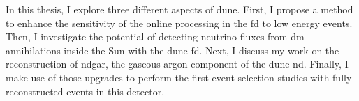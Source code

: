 In this thesis, I explore three different aspects of \gls{dune}. First, I propose a method to enhance the sensitivity of the online processing in the \gls{fd} to low energy events. Then, I investigate the potential of detecting neutrino fluxes from \gls{dm} annihilations inside the Sun with the \gls{dune} \gls{fd}. Next, I discuss my work on the reconstruction of \gls{ndgar}, the gaseous argon component of the \gls{dune} \gls{nd}. Finally, I make use of those upgrades to perform the first event selection studies with fully reconstructed events in this detector.

\begin{comment}
This thesis opens with an overview of the status of neutrino physics in Chapter \ref{chapter:neutrinos}. I start summarising the role that neutrinos play in the \gls{sm}, to then focus on the developments that lead to the discovery of neutrino oscillations and how to accommodate massive neutrinos in the model. I then discuss the phenomenology of the neutrino oscillations, as well as the current experimental landscape and open questions. In the final section, I review the basics of the neutrino-nucleus interaction modelling, which is of great importance for \gls{dune}.

Chapter \ref{chapter:dune} introduces \gls{dune}, its physics programme and various components. I give detail descriptions of the LBNF beamline, the near detector and the far detector designs. I also discuss the current staging plans for \gls{dune}. This leads to the of \gls{ndgar}, the more capable near detector planned for \gls{dune} Phase II.

In Chapter \ref{chapter:matched_filter} I start by reviewing how the trigger primitives (\gls{tp}s), the basic building blocks of the \gls{dune} far detector trigger chain, are formed. I then motivate how to use the filtering to enhance the TP generation in the induction channels. I describe the concept of matched filter, and how to optimise it using ProtoDUNE-SP data. I use different MC samples to study its performance, and assess how it improves the hit finding. Finally, I present the results of the tests we performed at the VD ColdBox setup at CERN, were for the first time we collected TP data with a matched filter.

The solar \gls{dm} analysis is presented in Chapter \ref{chapter:dm_analysis}. After reviewing the theoretical basis for the solar \gls{dm} capture and how capture and annihilation rates are related, I introduce the analysis framework used. I then focus on the event selection studies based on two topologies: high-energy \gls{dis} events and low-energy $1\mu1p$ QE events. I use these to extract the projected sensitivities for the \gls{dm}-nucleon scattering cross section, and compare them to the current status of other direct and indirect \gls{dm} searches. Additionally, I discuss the potential of \gls{dune} in two specific \gls{dm} models. I end with a discussion of the systematic uncertainties relevant for this analysis.


\end{comment}
